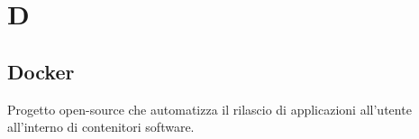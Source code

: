 \section*{D}
\markright{}
\subsection*{Docker}
Progetto open-source che automatizza il rilascio di applicazioni all'utente all'interno di contenitori software.
